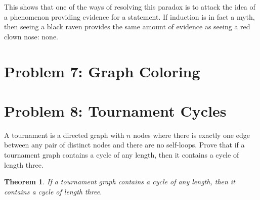 \documentclass[10pt,letter]{article}
\newtheorem*{thm}{Theorem}
\begin{document}
This shows that one of the ways of resolving this paradox is to attack the idea of a phenomenon providing evidence for a statement. If induction is in fact a myth, then seeing a black raven provides the same amount of evidence as seeing a red clown nose: none. 

\section*{Problem 7: Graph Coloring}


\pagebreak

\section*{Problem 8: Tournament Cycles}
A tournament is a directed graph with $n$ nodes where there is exactly one edge between any pair of distinct nodes and there are no self-loops. Prove that if a tournament graph contains a cycle of any length, then it contains a cycle of length three.

\begin{thm} If a tournament graph contains a cycle of any length, then it contains a cycle of length three.
\end{thm}
\end{document}
